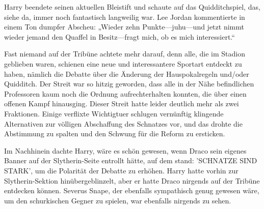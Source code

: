 Harry beendete seinen aktuellen Bleistift und schaute auf das Quidditchspiel, das, siehe da, immer noch fantastisch langweilig war.
Lee Jordan kommentierte in einem Ton dumpfer Abscheu: „Wieder zehn Punkte—juhu—und jetzt nimmt wieder jemand den Quaffel in Besitz—fragt mich, ob es mich interessiert.“

Fast niemand auf der Tribüne achtete mehr darauf, denn alle, die im Stadion geblieben waren, schienen eine neue und interessantere Sportart entdeckt zu haben, nämlich die Debatte über die Änderung der Hauspokalregeln und/oder Quidditch.
Der Streit war so hitzig geworden, dass alle in der Nähe befindlichen Professoren kaum noch die Ordnung aufrechterhalten konnten, die über einen offenen Kampf hinausging. Dieser Streit hatte leider deutlich mehr als zwei Fraktionen. Einige verflixte Wichtigtuer schlugen vernünftig klingende Alternativen zur völligen Abschaffung des Schnatzes vor, und das drohte die Abstimmung zu spalten und den Schwung für die Reform zu ersticken.

Im Nachhinein dachte Harry, wäre es schön gewesen, wenn Draco sein eigenes Banner auf der Slytherin-Seite entrollt hätte, auf dem stand:
'SCHNATZE SIND STARK', um die Polarität der Debatte zu erhöhen.
Harry hatte vorhin zur Slytherin-Sektion hinübergeblinzelt, aber er hatte Draco nirgends auf der Tribüne entdecken können. Severus Snape, der ebenfalls sympathisch genug gewesen wäre, um den schurkischen Gegner zu spielen, war ebenfalls nirgends zu sehen.

